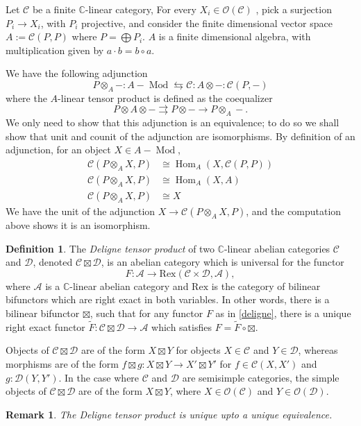 \documentclass[a4paper, 10pt]{book}
\newtheorem{Rem}[theorem]{Remark}
\theoremstyle{definition}
\newtheorem{Def}[theorem]{Definition}
\numberwithin{equation}{chapter}
\newcommand\Hom{\operatorname{Hom}}
\newcommand\Mod{\operatorname{Mod}}
\newcommand\kk{\mathbb C}
\newcommand\C{\mathcal C}
\newcommand\OO{\mathcal O}
\newcommand\D{\mathcal D}
\newcommand\A{\mathcal A}
\newcommand{\ra}\rightarrow
\begin{document}
Let $\C$ be a finite $\kk$-linear category, For every $X_i\in \OO(\C)$ , pick a surjection $P_i\rightarrow X_i$,  with $P_i$ projective, and consider the finite dimensional vector space $A:=\C(P, P)$ where $P= \bigoplus P_i$. $A$ is a finite dimensional algebra, with multiplication given by $a\cdot b = b\circ a$.


We have the following adjunction \begin{equation*}
P\otimes_A -:	A-\Mod \leftrightarrows \C : A\otimes - : \C(P, -)
\end{equation*}
where the $A$-linear tensor product is defined as the coequalizer  \begin{equation*}
	P \otimes A \otimes - \rightrightarrows P\otimes -\rightarrow P\otimes_A -.
\end{equation*}
We only need to show that this adjunction is an equivalence; to do so we shall show that unit and counit of the adjunction are isomorphisms.
By definition of an adjunction, for an object $X\in A-\Mod$, \begin{align}
	\C(P\otimes_A X, P) &\cong \Hom _{A} (X, \C(P, P))\\
	\C(P \otimes_A X, P) &\cong \Hom_{A}(X, A) \\
	\C(P \otimes_A X, P) &\cong X
\end{align}
We have the unit of the adjunction $X\rightarrow \C(P \otimes_A X, P)$, and the computation above shows it is an isomorphism.
\fi 
\begin{Def}\rm
The \textit{Deligne tensor product} of two $\kk$-linear abelian categories $\C$ and $\D$, denoted $\C \boxtimes \D$, is an abelian category which is universal for the functor 
\newcommand{\Rex}{\text{Rex}}
\begin{equation}
	\label{deligne}F: \A \ra \Rex(\C \times \D, \A),
\end{equation} where $\A$ is a $\kk$-linear abelian category and $\Rex$ is the category of bilinear bifunctors which are right exact in both variables. In other words, there is a bilinear bifunctor $\boxtimes$, such that for any functor $F$ as in \eqref{deligne}, there is a unique right exact functor $\tilde{F}:\C\boxtimes \D\ra \A$ which satisfies $ F= \tilde{F}\circ \boxtimes$.
\end{Def}
Objects of $\C \boxtimes \D$ are of the form $X\boxtimes Y$ for objects $X\in \C$ and $Y\in \D$, whereas morphisms are of the form $f\boxtimes g: X\boxtimes Y \ra X' \boxtimes Y'$ for $f\in \C(X, X')$  and $g: \D(Y, Y')$. In the case where $\C$ and $\D$ are semisimple categories, the simple objects of $\C\boxtimes \D$ are of the form $X\boxtimes Y$, where $X\in \OO(\C)$ and $Y\in \OO(\D)$.
\begin{Rem}\rm
The Deligne tensor product is unique upto a unique equivalence.
\end{Rem}
\end{document}
